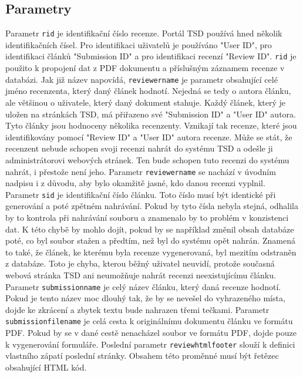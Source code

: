\documentclass[czech,BP]{thesiskiv}
\begin{document}
\subsection{Parametry}
Parametr \texttt{rid} je identifikační číslo recenze. Portál TSD používá hned několik identifikačních čísel. Pro identifikaci uživatelů je používáno "User ID", pro identifikaci článků "Submission ID" a pro identifikaci recenzí "Review ID". \texttt{rid} je použito k propojení dat z PDF dokumentu a příslušným záznamem recenze v databázi. 
Jak již název napovídá, \texttt{reviewer\textunderscore name} je parametr obsahující celé jméno recenzenta, který daný článek hodnotí. Nejedná se tedy o autora článku, ale většinou o uživatele, který daný dokument stahuje. Každý článek, který je uložen na stránkách TSD, má přiřazeno své "Submission ID" a "User ID" autora. Tyto články jsou hodnoceny několika recenzenty. Vznikají tak recenze, které jsou identifikovány pomocí "Review ID" a "User ID" autora recenze. Může se stát, že recenzent nebude schopen svoji recenzi nahrát do systému TSD a odešle ji administrátorovi webových stránek. Ten bude schopen tuto recenzi do systému nahrát, i přestože není jeho. Parametr \texttt{reviewer\textunderscore name} se nachází v úvodním nadpisu i z důvodu, aby bylo okamžitě jasné, kdo danou recenzi vyplnil.
Parametr \texttt{sid} je identifikační číslo článku. Toto číslo musí být identické při generování a poté zpětném nahrávání. Pokud by tyto čísla nebyla stejná, odhalila by to kontrola při nahrávání souboru a znamenalo by to problém v konzistenci dat. K této chybě by mohlo dojít, pokud by se například změnil obsah databáze poté, co byl soubor stažen a předtím, než byl do systému opět nahrán. Znamená to také, že článek, ke kterému byla recenze vygenerovaná, byl mezitím odstraněn z databáze. Toto je chyba, kterou běžný uživatel neuvidí, protože současná webová stránka TSD ani neumožňuje nahrát recenzi neexistujícímu článku.  
Parametr \texttt{submission\textunderscore name} je celý název článku, který daná recenze hodnotí. Pokud je tento název moc dlouhý tak, že by se nevešel do vyhrazeného místa, dojde ke zkrácení a zbytek textu bude nahrazen třemi tečkami. 
Parametr \texttt{submission\textunderscore filename} je celá cesta k originálnímu dokumentu článku ve formátu PDF. Pokud by se v dané cestě nenacházel soubor ve formátu PDF, dojde pouze k vygenerování formuláře.
Poslední parametr \texttt{review\textunderscore html\textunderscore footer} slouží k definici vlastního zápatí poslední stránky. Obsahem této proměnné musí být řetězec obsahující HTML kód. 
\end{document}
